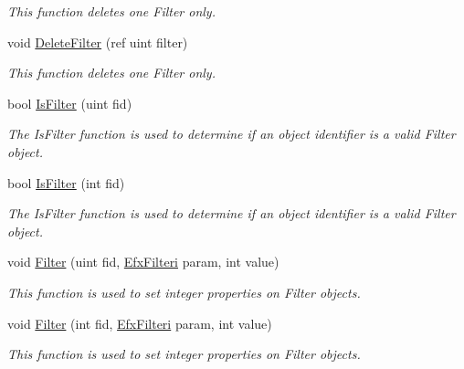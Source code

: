 \begin{DoxyCompactItemize}
\begin{DoxyCompactList}\small\item\em This function deletes one Filter only.\end{DoxyCompactList}\item 
void \hyperlink{class_open_t_k_1_1_audio_1_1_open_a_l_1_1_effects_extension_adcfd0f6ed1749a83543a067510dd3b7f}{Delete\-Filter} (ref uint filter)
\begin{DoxyCompactList}\small\item\em This function deletes one Filter only.\end{DoxyCompactList}\item 
bool \hyperlink{class_open_t_k_1_1_audio_1_1_open_a_l_1_1_effects_extension_a5e672010e215b7cef6ccf2a23a3d51a6}{Is\-Filter} (uint fid)
\begin{DoxyCompactList}\small\item\em The Is\-Filter function is used to determine if an object identifier is a valid Filter object.\end{DoxyCompactList}\item 
bool \hyperlink{class_open_t_k_1_1_audio_1_1_open_a_l_1_1_effects_extension_a0e7a55945fd9094fc149d73100ff46bb}{Is\-Filter} (int fid)
\begin{DoxyCompactList}\small\item\em The Is\-Filter function is used to determine if an object identifier is a valid Filter object.\end{DoxyCompactList}\item 
void \hyperlink{class_open_t_k_1_1_audio_1_1_open_a_l_1_1_effects_extension_a7b6cd1c3578195469ec829566afc104f}{Filter} (uint fid, \hyperlink{namespace_open_t_k_1_1_audio_1_1_open_a_l_a071c0527689a9645ced24caee8e0f542}{Efx\-Filteri} param, int value)
\begin{DoxyCompactList}\small\item\em This function is used to set integer properties on Filter objects.\end{DoxyCompactList}\item 
void \hyperlink{class_open_t_k_1_1_audio_1_1_open_a_l_1_1_effects_extension_a399ccfd829426685d54adfe12a2e1def}{Filter} (int fid, \hyperlink{namespace_open_t_k_1_1_audio_1_1_open_a_l_a071c0527689a9645ced24caee8e0f542}{Efx\-Filteri} param, int value)
\begin{DoxyCompactList}\small\item\em This function is used to set integer properties on Filter objects.\end{DoxyCompactList}\item 

\end{DoxyCompactItemize}
